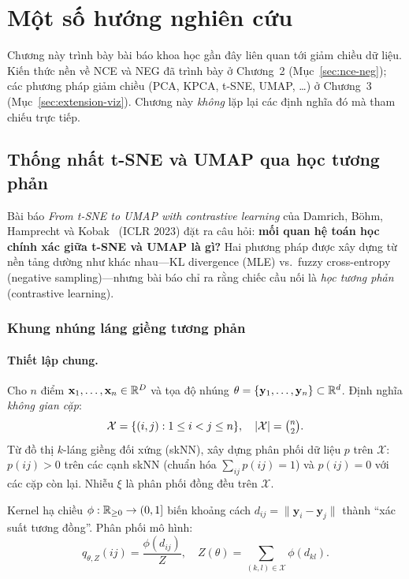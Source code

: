 \section{Một số hướng nghiên cứu}

Chương này trình bày bài báo khoa học gần đây liên quan tới giảm chiều dữ liệu. Kiến thức nền về NCE và NEG đã trình bày ở Chương~2 (Mục~\ref{sec:nce-neg}); các phương pháp giảm chiều (PCA, KPCA, t-SNE, UMAP, \ldots) ở Chương~3 (Mục~\ref{sec:extension-viz}). Chương này \emph{không} lặp lại các định nghĩa đó mà tham chiếu trực tiếp.

\subsection{Thống nhất t-SNE và UMAP qua học tương phản}
\label{sec:research-contrastive}

Bài báo \emph{From t-SNE to UMAP with contrastive learning} của Damrich, Böhm, Hamprecht và Kobak~\cite{damrich2023contrastive} (ICLR 2023) đặt ra câu hỏi: \textbf{mối quan hệ toán học chính xác giữa t-SNE và UMAP là gì?} Hai phương pháp được xây dựng từ nền tảng dường như khác nhau---KL divergence (MLE) vs.\ fuzzy cross-entropy (negative sampling)---nhưng bài báo chỉ ra rằng chiếc cầu nối là \emph{học tương phản} (contrastive learning).

\subsubsection{Khung nhúng láng giềng tương phản}
\label{sec:neighbor-embedding-framework}

\paragraph{Thiết lập chung.}
Cho $n$ điểm $\mathbf{x}_1,\ldots,\mathbf{x}_n \in \mathbb{R}^D$ và tọa độ nhúng $\theta = \{\mathbf{y}_1,\ldots,\mathbf{y}_n\} \subset \mathbb{R}^d$. Định nghĩa \emph{không gian cặp}:
\begin{equation}
  \mathcal{X} = \{(i,j) : 1 \le i < j \le n\}, \quad |\mathcal{X}| = \tbinom{n}{2}.
  \label{eq:pair-space}
\end{equation}
Từ đồ thị $k$-láng giềng đối xứng (skNN), xây dựng phân phối dữ liệu $p$ trên $\mathcal{X}$: $p(ij) > 0$ trên các cạnh skNN (chuẩn hóa $\sum_{ij} p(ij) = 1$) và $p(ij) = 0$ với các cặp còn lại. Nhiễu $\xi$ là phân phối đồng đều trên $\mathcal{X}$.

Kernel hạ chiều $\phi : \mathbb{R}_{\ge 0} \to (0,1]$ biến khoảng cách $d_{ij} = \|\mathbf{y}_i - \mathbf{y}_j\|$ thành ``xác suất tương đồng''. Phân phối mô hình:
\begin{equation}
  q_{\theta,Z}(ij) = \frac{\phi(d_{ij})}{Z}, \quad
  Z(\theta) = \sum_{(k,l)\in\mathcal{X}} \phi(d_{kl}).
  \label{eq:model-dist}
\end{equation}

